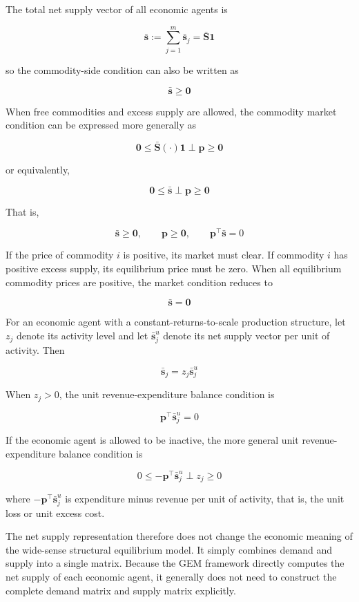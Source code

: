 \documentclass[
  letterpaper,
  DIV=11,
  numbers=noendperiod]{scrreprt}
\begin{document}
The total net supply vector of all economic agents is

\[
\bar{\mathbf s}
:=
\sum_{j=1}^{m}\bar{\mathbf s}_j
=
\bar{\mathbf S}\mathbf 1
\]

so the commodity-side condition can also be written as

\[
\bar{\mathbf s}\geq\mathbf 0
\]

When free commodities and excess supply are allowed, the commodity
market condition can be expressed more generally as

\[
\mathbf 0
\leq
\bar{\mathbf S}(\cdot)\mathbf 1
\perp
\mathbf p
\geq
\mathbf 0
\]

or equivalently,

\[
\mathbf 0
\leq
\bar{\mathbf s}
\perp
\mathbf p
\geq
\mathbf 0
\]

That is,

\[
\bar{\mathbf s}\geq\mathbf 0,\qquad
\mathbf p\geq\mathbf 0,\qquad
\mathbf p^\top\bar{\mathbf s}=0
\]

If the price of commodity \(i\) is positive, its market must clear. If
commodity \(i\) has positive excess supply, its equilibrium price must
be zero. When all equilibrium commodity prices are positive, the market
condition reduces to

\[
\bar{\mathbf s}=\mathbf 0
\]

For an economic agent with a constant-returns-to-scale production
structure, let \(z_j\) denote its activity level and let
\(\bar{\mathbf s}_j^{u}\) denote its net supply vector per unit of
activity. Then

\[
\bar{\mathbf s}_j
=
z_j\bar{\mathbf s}_j^{u}
\]

When \(z_j>0\), the unit revenue-expenditure balance condition is

\[
\mathbf p^\top\bar{\mathbf s}_j^{u}=0
\]

If the economic agent is allowed to be inactive, the more general unit
revenue-expenditure balance condition is

\[
0
\leq
-\mathbf p^\top\bar{\mathbf s}_j^{u}
\perp
z_j
\geq
0
\]

where \(-\mathbf p^\top\bar{\mathbf s}_j^{u}\) is expenditure minus
revenue per unit of activity, that is, the unit loss or unit excess
cost.

The net supply representation therefore does not change the economic
meaning of the wide-sense structural equilibrium model. It simply
combines demand and supply into a single matrix. Because the GEM
framework directly computes the net supply of each economic agent, it
generally does not need to construct the complete demand matrix and
supply matrix explicitly.
\end{document}
